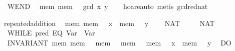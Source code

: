 \documentclass{llncs}
\begin{document}
\begin{isabellebody}
\ \ WEND\isanewline
\ \ {}{}mem{}\ mem\ {}\ {}\ gcd\ x\ y{}{}{}\isanewline
%
\isadelimproof
\ \ %
\endisadelimproof
%
\isatagproof
{}\isamarkupfalse%
\ hoare{}auto\ {}metis\ gcd{}red{}nat{}%
\endisatagproof
\end{isabellebody}

\begin{isabellebody}
\isanewline
{}\isamarkupfalse%
\ repeated{}addition{}\isanewline
\ \ {}{}{}mem{}\ mem\ {}\ {}\ x\ {}\ mem\ {}\ {}\ y{}{}\isanewline
\ \ {}\ {}{}\ NAT\ {}{}\isanewline
\ \ {}\ {}{}\ NAT\ {}{}\isanewline
\ \ {}WHILE\ {}{}pred\ {}EQ\ {}Var\ {}{}\ {}Var\ {}{}{}{}\isanewline
\ \ INVARIANT\ {}mem{}\ mem\ {}\ {}\ mem\ {}\ {}\ mem\ {}\ {}\ mem\ {}\ {}\ x\ {}\ mem\ {}\ {}\ y{}\isanewline
\ \ DO\isanewline

\end{isabellebody}
\end{document}
